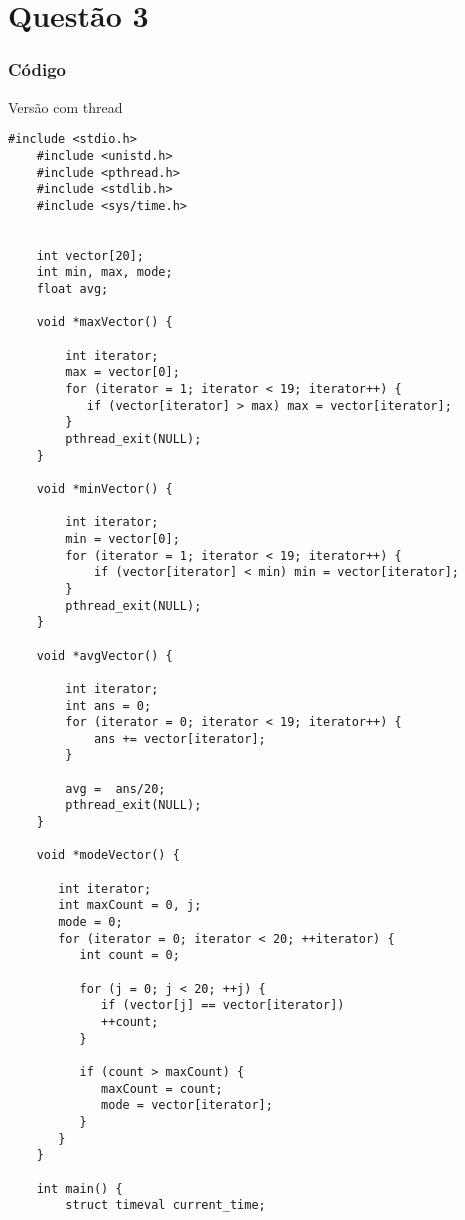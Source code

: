 \graphicspath{ {./images/} }

\chapter{Questão 3}

\subsection*{Código}

Versão com thread

\begin{lstlisting}[style=CStyle]
    #include <stdio.h>
    #include <unistd.h>
    #include <pthread.h>
    #include <stdlib.h>
    #include <sys/time.h>
    
    
    int vector[20];
    int min, max, mode;
    float avg;
    
    void *maxVector() {
    
        int iterator;
        max = vector[0];
        for (iterator = 1; iterator < 19; iterator++) {
           if (vector[iterator] > max) max = vector[iterator];
        }
        pthread_exit(NULL);
    }
    
    void *minVector() {
    
        int iterator;
        min = vector[0];
        for (iterator = 1; iterator < 19; iterator++) {
            if (vector[iterator] < min) min = vector[iterator];
        }
        pthread_exit(NULL);
    }
    
    void *avgVector() {
    
        int iterator;
        int ans = 0;
        for (iterator = 0; iterator < 19; iterator++) {
            ans += vector[iterator];
        }
    
        avg =  ans/20;
        pthread_exit(NULL);
    }
    
    void *modeVector() {
       
       int iterator;   
       int maxCount = 0, j;
       mode = 0;
       for (iterator = 0; iterator < 20; ++iterator) {
          int count = 0;
          
          for (j = 0; j < 20; ++j) {
             if (vector[j] == vector[iterator])
             ++count;
          }
          
          if (count > maxCount) {
             maxCount = count;
             mode = vector[iterator];
          }
       }
    }
    
    int main() {
        struct timeval current_time;
        

\end{lstlisting}
